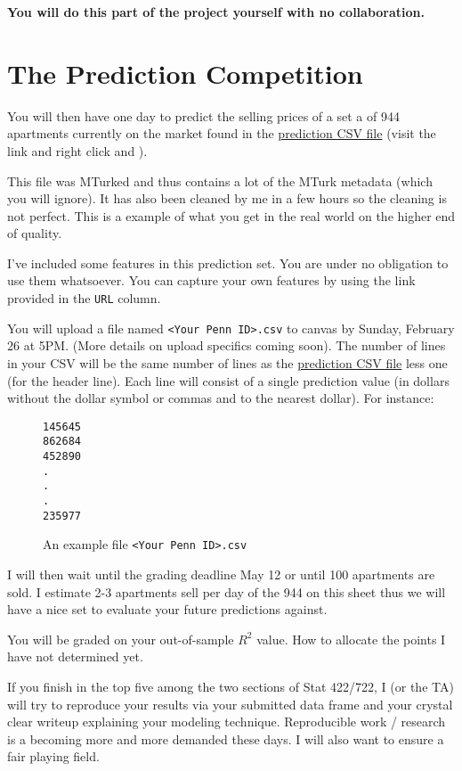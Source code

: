 \documentclass[12pt]{article}
\begin{document}
\textbf{You will do this part of the project yourself with no collaboration.}

\section{The Prediction Competition}

You will then have one day to predict the selling prices of a set a of 944 apartments currently on the market found in the \href{https://raw.githubusercontent.com/kapelner/Wharton_Stat_422_722/master/assignments/project/stat_422_722_project_prediction_set.csv}{prediction CSV file} (visit the link and right click and ). 

This file was MTurked and thus contains a lot of the MTurk metadata (which you will ignore). It has also been cleaned by me in a few hours so the cleaning is not perfect. This is a example of what you get in the real world on the higher end of quality.

I've included some features in this prediction set. You are under no obligation to use them whatsoever. You can capture your own features by using the link provided in the \texttt{URL} column.

You will upload a file named \texttt{<Your Penn ID>.csv} to canvas by Sunday, February 26 at 5PM. (More details on upload specifics coming soon). The number of lines in your CSV will be the same number of lines as the \href{https://raw.githubusercontent.com/kapelner/Wharton_Stat_422_722/master/assignments/project/stat_422_722_project_prediction_set.csv}{prediction CSV file} less one (for the header line). Each line will consist of a single prediction value (in dollars without the dollar symbol or commas and to the nearest dollar). For instance:

\begin{figure}[htp]
\begin{Verbatim}[frame=single, fontsize = \small]
145645
862684
452890
.
.
.
235977
\end{Verbatim}
\caption{An example file \texttt{<Your Penn ID>.csv}}
\end{figure}

I will then wait until the grading deadline May 12 or until 100 apartments are sold. I estimate 2-3 apartments sell per day of the 944 on this sheet thus we will have a nice set to evaluate your future predictions against.

You will be graded on your out-of-sample $R^2$ value. How to allocate the points I have not determined yet.

If you finish in the top five among the two sections of Stat 422/722, I (or the TA) will try to reproduce your results via your submitted data frame and your crystal clear writeup explaining your modeling technique. Reproducible work / research is a becoming more and more demanded these days. I will also want to ensure a fair playing field.
\end{document}

